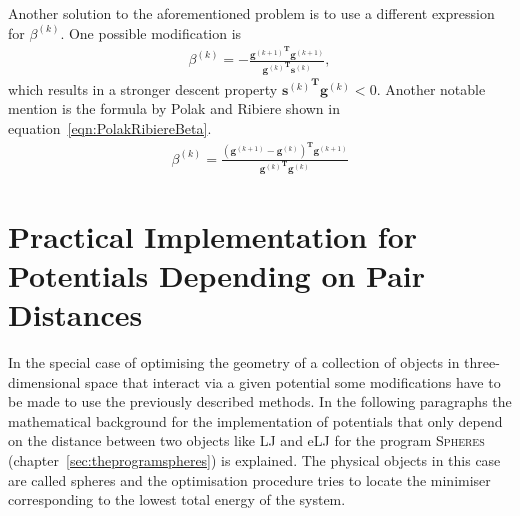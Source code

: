 Another solution to the aforementioned problem is to use a different expression
for $\beta^{(k)}$. One possible modification is
%
\begin{align}
    \beta^{(k)}=-\frac{{\mathbf{g}^{(k+1)}}^\mathbf{T}\mathbf{g}^{(k+1)}}{{\mathbf{g}^{(k)}}^\mathbf{T}\mathbf{s}^{(k)}}\label{eqn:DescentBeta},
\end{align}
%
which results in a stronger descent property
${\mathbf{s}^{(k)}}^\mathbf{T}\mathbf{g}^{(k)} < 0$. Another notable mention is
the formula by Polak and
Ribiere\autocite{Polak_ComputationalMethodsOptimization_1971} shown in
equation~\eqref{eqn:PolakRibiereBeta}.
%
\begin{align}
    \beta^{(k)}=\frac{\left(\mathbf{g}^{(k+1)}-\mathbf{g}^{(k)}\right)^\mathbf{T}\mathbf{g}^{(k+1)}}{{\mathbf{g}^{(k)}}^\mathbf{T}\mathbf{g}^{(k)}}\label{eqn:PolakRibiereBeta}
\end{align}

\section{Practical Implementation for Potentials Depending on Pair Distances}
\label{sec:PracticalImplementationForPotentialsDependingOnPairDistances}

In the special case of optimising the geometry of a collection of objects in
three-dimensional space that interact via a given potential some modifications
have to be made to use the previously described methods. In the following
paragraphs the mathematical background for the implementation of potentials
that only depend on the distance between two objects like \ac{LJ} and \ac{eLJ}
for the program \textsc{Spheres} (chapter~\ref{sec:theprogramspheres}) is
explained. The physical objects in this case are called spheres and the
optimisation procedure tries to locate the minimiser corresponding to the
lowest total energy of the system.


